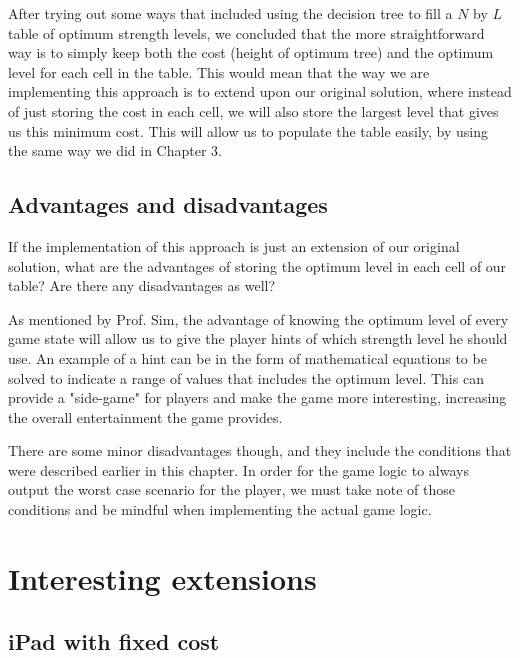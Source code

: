 \documentclass[12pt,a4paper,oneside]{report}
\begin{document}
After trying out some ways that included using the decision tree to fill a $N$ by $L$ table of optimum strength levels, we concluded that the more straightforward way is to simply keep both the cost (height of optimum tree) and the optimum level for each cell in the table. This would mean that the way we are implementing this approach is to extend upon our original solution, where instead of just storing the cost in each cell, we will also store the largest level that gives us this minimum cost. This will allow us to populate the table easily, by using the same way we did in Chapter 3.

\section{Advantages and disadvantages}
If the implementation of this approach is just an extension of our original solution, what are the advantages of storing the optimum level in each cell of our table? Are there any disadvantages as well? 

As mentioned by Prof. Sim, the advantage of knowing the optimum level of every game state will allow us to give the player hints of which strength level he should use. An example of a hint can be in the form of mathematical equations to be solved to indicate a range of values that includes the optimum level. This can provide a "side-game" for players and make the game more interesting, increasing the overall entertainment the game provides. 

There are some minor disadvantages though, and they include the conditions that were described earlier in this chapter. In order for the game logic to always output the worst case scenario for the player, we must take note of those conditions and be mindful when implementing the actual game logic.


\chapter{Interesting extensions}
\section{iPad with fixed cost}
\end{document}
